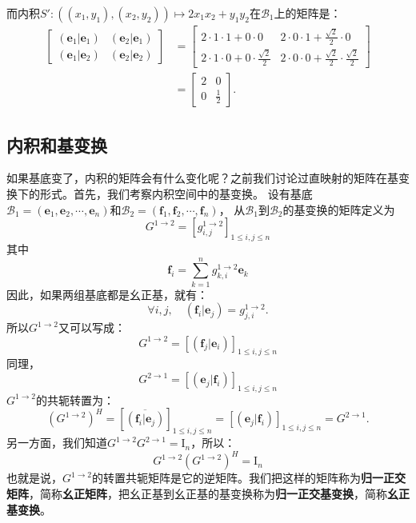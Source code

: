 \documentclass[12pt,UTF8,fontset=none]{ctexbook}
\begin{document}
而内积$S': \left((x_1, y_1), (x_2, y_2) \right) \mapsto 2 x_1 x_2 + y_1 y_2$在$\mathcal{B}_1$上的矩阵是：
\begin{align*}
    \begin{bmatrix}
        (\mathbf{e}_1 |\mathbf{e}_1) & (\mathbf{e}_2 |\mathbf{e}_1) \\
        (\mathbf{e}_1 |\mathbf{e}_2) & (\mathbf{e}_2 |\mathbf{e}_2)
    \end{bmatrix} &= \begin{bmatrix}
        2\cdot 1\cdot 1 + 0\cdot 0 &  2\cdot 0\cdot 1 + \frac{\sqrt{2}}{2} \cdot 0 \\
        2\cdot 1\cdot 0 + 0\cdot \frac{\sqrt{2}}{2} & 2\cdot 0\cdot 0 + \frac{\sqrt{2}}{2} \cdot \frac{\sqrt{2}}{2}
    \end{bmatrix}  \\
    &= \begin{bmatrix}
       2 & 0 \\
       0 & \frac12
    \end{bmatrix}. 
\end{align*}

\subsection{内积和基变换}
如果基底变了，内积的矩阵会有什么变化呢？之前我们讨论过直映射的矩阵在基变换下的形式。首先，我们考察内积空间中的基变换。
设有基底$ \mathcal{B}_1 = (\mathbf{e}_1, \mathbf{e}_2, \cdots , \mathbf{e}_n )$和$ \mathcal{B}_2 = (\mathbf{f}_1, \mathbf{f}_2, \cdots , \mathbf{f}_n )$，
从$\mathcal{B}_1$到$\mathcal{B}_2$的基变换的矩阵定义为
$$ G^{1\rightarrow 2} = \left[g_{i,j}^{1\rightarrow 2}\right]_{1\leqslant i , j \leqslant n} $$
其中
$$ \mathbf{f}_i = \sum_{k=1}^n g_{k,i}^{1\rightarrow 2} \mathbf{e}_k $$
因此，如果两组基底都是幺正基，就有：
$$ \forall i, j, \quad (\mathbf{f}_i | \mathbf{e}_j) = g_{j,i}^{1\rightarrow 2}. $$
所以$ G^{1\rightarrow 2}$又可以写成：
$$ G^{1\rightarrow 2} = [(\mathbf{f}_j | \mathbf{e}_i)]_{1\leqslant i , j \leqslant n} $$
同理，
$$ G^{2\rightarrow 1} = [(\mathbf{e}_j | \mathbf{f}_i)]_{1\leqslant i , j \leqslant n} $$
$ G^{1\rightarrow 2}$的共轭转置为：
$$ \left(G^{1\rightarrow 2} \right)^H = [\overline{(\mathbf{f}_i | \mathbf{e}_j)}]_{1\leqslant i , j \leqslant n} = [(\mathbf{e}_j | \mathbf{f}_i)]_{1\leqslant i , j \leqslant n} = G^{2\rightarrow 1}. $$
另一方面，我们知道$ G^{1\rightarrow 2} G^{2\rightarrow 1} = \mathrm{I}_n $，所以：
$$ G^{1\rightarrow 2} \left(G^{1\rightarrow 2} \right)^H = \mathrm{I}_n $$
也就是说，$G^{1\rightarrow 2}$的转置共轭矩阵是它的逆矩阵。我们把这样的矩阵称为\textbf{归一正交矩阵}，简称\textbf{幺正矩阵}，把幺正基到幺正基的基变换称为\textbf{归一正交基变换}，简称\textbf{幺正基变换}。
\end{document}
